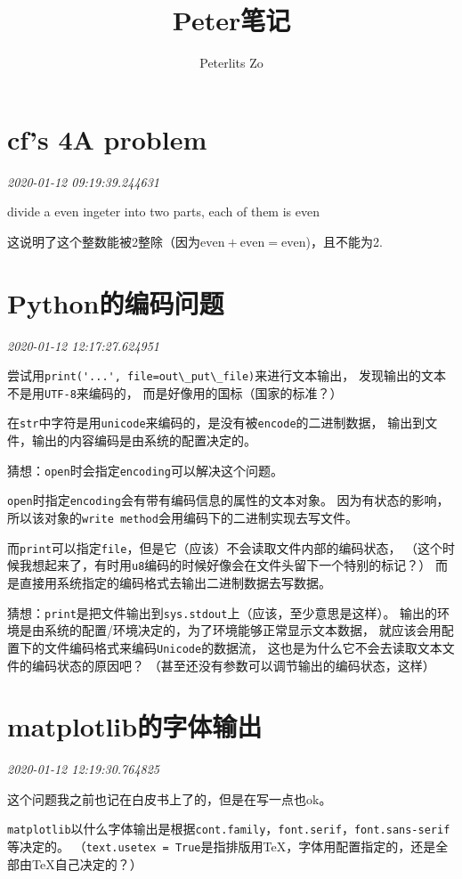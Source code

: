 \documentclass{peterlitsdoc}
\author{Peterlits Zo}
\title{Peter笔记}
\newcommand{\timetx}[1]
    {\par\noindent\emph{\pltgray\small #1}\vspace{2em}}
\newcommand{\vb}{\verb}
\begin{document}
\maketitle
\tableofcontents
\newpage

\section{cf's 4A problem}
\timetx{2020-01-12 09:19:39.244631}

divide a even ingeter into two parts, each of them is even

这说明了这个整数能被2整除（因为$\text{even}+\text{even}=\text{even}$)，且不能为2.


\section{Python的编码问题}\timetx{2020-01-12 12:17:27.624951}

尝试用\vb|print('...', file=out\_put\_file)|来进行文本输出，
发现输出的文本不是用\vb|UTF-8|来编码的，
而是好像用的国标（国家的标准？）

在\vb|str|中字符是用\vb|unicode|来编码的，是没有被\vb|encode|的二进制数据，
输出到文件，输出的内容编码是由系统的配置决定的。

猜想：\vb|open|时会指定\vb|encoding|可以解决这个问题。

\vb|open|时指定\vb|encoding|会有带有编码信息的属性的文本对象。
因为有状态的影响，所以该对象的\vb|write method|会用编码下的二进制实现去写文件。

而\vb|print|可以指定\vb|file|，但是它（应该）不会读取文件内部的编码状态，
（这个时候我想起来了，有时用\vb|u8|编码的时候好像会在文件头留下一个特别的标记？）
而是直接用系统指定的编码格式去输出二进制数据去写数据。

猜想：\vb|print|是把文件输出到\vb|sys.stdout|上（应该，至少意思是这样）。
输出的环境是由系统的配置/环境决定的，为了环境能够正常显示文本数据，
就应该会用配置下的文件编码格式来编码\vb|Unicode|的数据流，
这也是为什么它不会去读取文本文件的编码状态的原因吧？
（甚至还没有参数可以调节输出的编码状态，这样）


\section{matplotlib的字体输出}\timetx{2020-01-12 12:19:30.764825}

这个问题我之前也记在白皮书上了的，但是在写一点也ok。

\vb|matplotlib|以什么字体输出是根据\vb|cont.family|，\vb|font.serif|，\vb|font.sans-serif|等决定的。
（\vb|text.usetex = True|是指排版用\TeX ，字体用配置指定的，还是全部由\TeX 自己决定的？）
\end{document}
